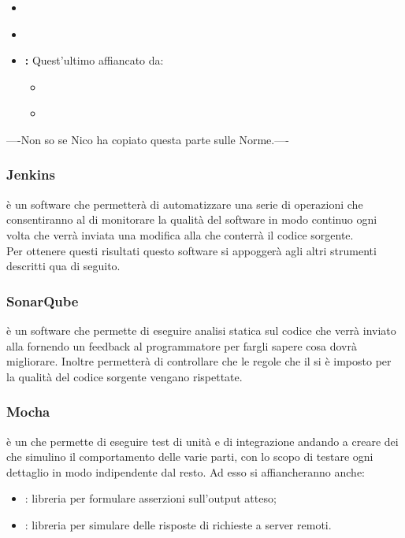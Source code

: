 \begin{itemize}
\item \textbf{}
\item \textbf{}
\item \textbf{:} 
Quest'ultimo affiancato da:
\begin{itemize}
\item \textbf{}
\item \textbf{}
\end{itemize}
\end{itemize}

----Non so se Nico ha copiato questa parte sulle Norme.----

\subsubsection{Jenkins}
 è un software che permetterà di automatizzare una serie di operazioni che consentiranno al  di monitorare la qualità del software in modo continuo ogni volta che verrà inviata una modifica alla  che conterrà il codice sorgente. \\
Per ottenere questi risultati questo software si appoggerà agli altri strumenti descritti qua di seguito.

\subsubsection{SonarQube}
 è un software che permette di eseguire analisi statica sul codice che verrà inviato alla  fornendo un feedback al programmatore per fargli sapere cosa dovrà migliorare. Inoltre permetterà di controllare che le regole che il  si è imposto per la qualità del codice sorgente vengano rispettate.

\subsubsection{Mocha}
 è un  che permette di eseguire test di unità e di integrazione andando a creare dei  che simulino il comportamento delle varie parti, con lo scopo di testare ogni dettaglio in modo indipendente dal resto. Ad esso si affiancheranno anche:
\begin{itemize}
\item \textbf{}: libreria per formulare asserzioni sull'output atteso;
\item \textbf{}: libreria per simulare delle risposte di richieste a server remoti.
\end{itemize}